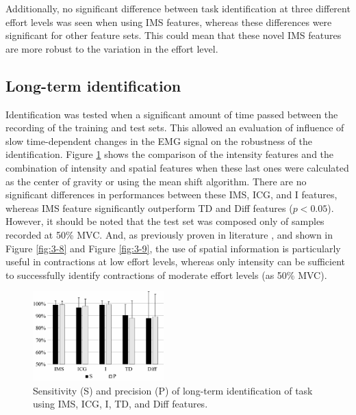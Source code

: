Additionally, no significant difference between task identification at three different effort levels was seen when using IMS features, whereas these differences were significant for other feature sets. This could mean that these novel IMS features are more robust to the variation in the effort level.

\subsection{Long-term identification}
Identification was tested when a significant amount of time passed between the recording of the training and test sets. This allowed an evaluation of influence of slow time-dependent changes in the EMG signal on the robustness of the identification. Figure \ref{fig:3-10} shows the comparison of the intensity features and the combination of intensity and spatial features when these last ones were calculated as the center of gravity or using the mean shift algorithm. There are no significant differences in performances between these IMS, ICG, and I features, whereas IMS feature significantly outperform TD and Diff features ($p < 0.05$). However, it should be noted that the test set was composed only of samples recorded at 50\% MVC. And, as previously proven in literature \citep{Jordanic2016a}, and shown in Figure \ref{fig:3-8} and Figure \ref{fig:3-9}, the use of spatial information is particularly useful in contractions at low effort levels, whereas only intensity can be sufficient to successfully identify contractions of moderate effort levels (as 50\% MVC).

\begin{figure}[ht]
\centering
\includegraphics[width=0.45\textwidth]{Images/figure3_10.png}
\caption{Sensitivity (S) and precision (P) of long-term identification of task using IMS, ICG, I, TD, and Diff features.}
\label{fig:3-10}
\end{figure}   


